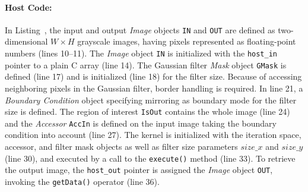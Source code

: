 \paragraph{Host Code:}
In Listing~, the input and output {\em Image} objects {\tt IN} and {\tt OUT} are defined as two-dimensional $W \times H$ grayscale images, having pixels represented as floating-point numbers (lines 10--11). The {\em Image} object {\tt IN} is initialized with the {\tt host\_in} pointer to a plain C array (line 14). The Gaussian filter {\em Mask} object {\tt GMask} is defined (line 17) and is initialized (line 18) for the filter size. Because of accessing neighboring pixels in the Gaussian filter, border handling is required. In line 21, a {\em Boundary Condition} object specifying mirroring as boundary mode for the filter size is defined. The region of interest {\tt IsOut} contains the whole image (line 24) and the {\em Accessor} {\tt AccIn} is defined on the input image taking the boundary condition into account (line 27). The kernel is initialized with the iteration space, accessor, and filter mask objects as well as filter size parameters $size\_x$ and $size\_y$ (line 30), and executed by a call to the {\tt execute()} method (line 33). To retrieve the output image, the {\tt host\_out} pointer is assigned the {\em Image} object {\tt OUT}, invoking the {\tt getData()} operator (line 36).

